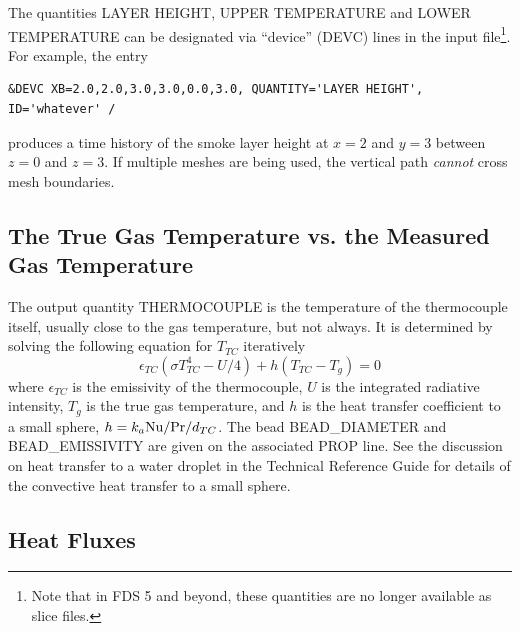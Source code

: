 \documentclass[11pt]{book}
\newcommand{\be}{\begin{equation}}
\newcommand{\ee}{\end{equation}}
\newcommand{\PR}{\hbox{Pr}}
\newcommand{\NU}{\hbox{Nu}}
\begin{document}
The quantities {\ct LAYER HEIGHT}, {\ct UPPER TEMPERATURE} and {\ct LOWER TEMPERATURE}
can be designated via ``device'' ({\ct DEVC}) lines in the input file\footnote{Note that in FDS 5 and beyond, these quantities
are no longer available as slice files.}. For example, the entry

\footnotesize
\begin{verbatim}
&DEVC XB=2.0,2.0,3.0,3.0,0.0,3.0, QUANTITY='LAYER HEIGHT', ID='whatever' /
\end{verbatim}
\normalsize

\noindent
produces a time history of the smoke layer height at $x=2$ and $y=3$ between $z=0$ and $z=3$.
If multiple meshes are being used, the vertical path {\em cannot} cross mesh boundaries.



\subsection{The True Gas Temperature vs. the Measured Gas Temperature}
\label{info:THERMOCOUPLE}

The output quantity {\ct THERMOCOUPLE} is the temperature
of the thermocouple itself, usually close to the gas temperature, but not
always. It is determined by solving the following equation
for $T_{TC}$ iteratively~\cite{Welsh:1}
\be \epsilon_{TC} (\sigma T_{TC}^4- U/4) + h(T_{TC}-T_g) = 0 \ee
where $\epsilon_{TC}$ is the emissivity of the thermocouple, $U$ is the
integrated radiative intensity, $T_g$ is the true gas temperature, and
$h$ is the heat transfer coefficient to a small sphere,
$h=k_a \NU/\PR/d_{TC}$. The bead {\ct BEAD\_DIAMETER} and {\ct BEAD\_EMISSIVITY} are given on the associated {\ct PROP} line.
See the discussion on heat transfer to a water
droplet in the Technical Reference Guide for details of the convective
heat transfer to a small sphere.


\subsection{Heat Fluxes}
\label{info:heat_flux}
\end{document}
